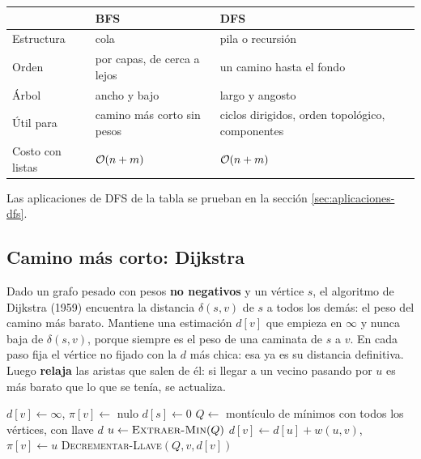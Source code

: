 \documentclass[11pt,letterpaper]{article}
\begin{document}
\begin{center}
\small
\begin{tabular}{lll}
  \toprule
  & \textbf{BFS} & \textbf{DFS} \\
  \midrule
  Estructura & cola & pila o recursión \\
  Orden & por capas, de cerca a lejos & un camino hasta el fondo \\
  Árbol & ancho y bajo & largo y angosto \\
  Útil para & camino más corto sin pesos & ciclos dirigidos, orden
    topológico, componentes \\
  Costo con listas & $\mathcal{O}\!\left(n + m\right)$ & $\mathcal{O}\!\left(n + m\right)$ \\
  \bottomrule
\end{tabular}
\end{center}

Las aplicaciones de DFS de la tabla se prueban en la
sección \ref{sec:aplicaciones-dfs}.


\subsection*{Camino más corto: Dijkstra}

Dado un grafo pesado con pesos \textbf{no negativos} y un vértice $s$,
el algoritmo de Dijkstra (1959) encuentra la distancia $\delta(s, v)$
de $s$ a todos los demás: el peso del camino más barato. Mantiene una
estimación $d[v]$ que empieza en $\infty$ y nunca baja de
$\delta(s, v)$, porque siempre es el peso de una caminata de $s$ a
$v$. En cada paso fija el vértice no fijado con la $d$ más chica: esa
ya es su distancia definitiva. Luego \textbf{relaja} las aristas que
salen de él: si llegar a un vecino pasando por $u$ es más barato que
lo que se tenía, se actualiza.

\begin{algorithm}[H]
\caption{\textsc{Dijkstra}$(G, w, s)$}
\begin{algorithmic}[1]
  \State $d[v] \gets \infty$, \quad $\pi[v] \gets$ nulo
\EndFor
\State $d[s] \gets 0$
\State $Q \gets$ montículo de mínimos con todos los vértices, con
       llave $d$
  \State $u \gets \textsc{Extraer-Min}(Q)$ 
     
      \State $d[v] \gets d[u] + w(u, v)$, \quad $\pi[v] \gets u$
      \State \textsc{Decrementar-Llave}$(Q, v, d[v])$
    \EndIf
  \EndFor
\EndWhile
\end{algorithmic}
\end{algorithm}
\end{document}
